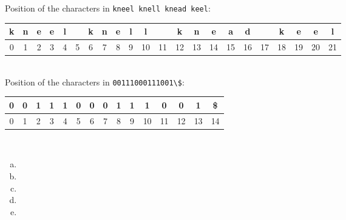 \documentclass[12pt]{article}
\begin{document}
Position of the characters in \verb+kneel knell knead keel+:\\
\begin{tabular}{|c|c|c|c|c|c|c|c|c|c|c|c|c|c|c|c|c|c|c|c|c|c|}
\hline
k & n & e & e & l & & k & n & e & l & l & & k & n & e & a & d & & k & e & e & l\\\hline
0 & 1 & 2 & 3 & 4 & 5 & 6 & 7 & 8 & 9 & 10 & 11 & 12 & 13 & 14 & 15 & 16 & 17 & 18 & 19 & 20 & 21\\\hline
\end{tabular}\\

Position of the characters in \verb+00111000111001\$+:\\
\begin{tabular}{|c|c|c|c|c|c|c|c|c|c|c|c|c|c|c|}
\hline
0 & 0 & 1 & 1 & 1 & 0 & 0 & 0 & 1 & 1 & 1 & 0 & 0 & 1 & \$\\\hline
0 & 1 & 2 & 3 & 4 & 5 & 6 & 7 & 8 & 9 & 10 & 11 & 12 & 13 & 14\\\hline
\end{tabular}\\

\begin{enumerate}[(a)]
\clearpage
\item  \done
\item  \done
\item  \done
\item  \done
\item  \done
\end{enumerate}
\end{document}
